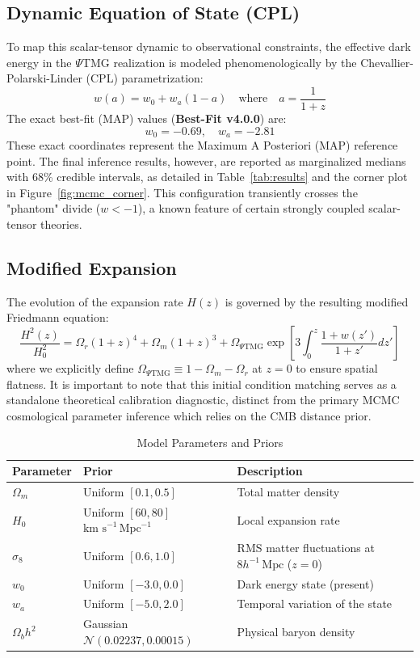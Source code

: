 \documentclass[11pt, a4paper]{article}
\begin{document}
\subsection{Dynamic Equation of State (CPL)}
To map this scalar-tensor dynamic to observational constraints, the effective dark energy in the $\Psi$TMG realization is modeled phenomenologically by the Chevallier-Polarski-Linder (CPL) parametrization:
\begin{equation}
    w(a) = w_0 + w_a (1 - a) \quad \text{where} \quad a = \frac{1}{1+z}
\end{equation}
The exact best-fit (MAP) values (\textbf{Best-Fit v4.0.0}) are:
$$ w_0 = -0.69, \quad w_a = -2.81 $$
These exact coordinates represent the Maximum A Posteriori (MAP) reference point. The final inference results, however, are reported as marginalized medians with 68\% credible intervals, as detailed in Table~\ref{tab:results} and the corner plot in Figure~\ref{fig:mcmc_corner}.
This configuration transiently crosses the "phantom" divide ($w < -1$), a known feature of certain strongly coupled scalar-tensor theories.

\subsection{Modified Expansion}
The evolution of the expansion rate $H(z)$ is governed by the resulting modified Friedmann equation:
\begin{equation}
    \frac{H^2(z)}{H_0^2} = \Omega_r (1+z)^4 + \Omega_m (1+z)^3 + \Omega_{\Psi\mathrm{TMG}} \exp\left[3 \int_0^z \frac{1+w(z')}{1+z'} dz'\right]
\end{equation}
where we explicitly define $\Omega_{\Psi\mathrm{TMG}} \equiv 1 - \Omega_m - \Omega_r$ at $z=0$ to ensure spatial flatness.
It is important to note that this initial condition matching serves as a standalone theoretical calibration diagnostic, distinct from the primary MCMC cosmological parameter inference which relies on the CMB distance prior.

\begin{table}[H]
    \centering
    \caption{Model Parameters and Priors}
    \begin{tabular}{lll}
        \toprule
        Parameter & Prior & Description \\
        \midrule
        $\Omega_m$ & Uniform $[0.1, 0.5]$ & Total matter density \\
        $H_0$ & Uniform $[60, 80]$ $\text{km s}^{-1}\,\text{Mpc}^{-1}$ & Local expansion rate \\
        $\sigma_8$ & Uniform $[0.6, 1.0]$ & RMS matter fluctuations at $8 h^{-1}\,\text{Mpc}$ ($z=0$) \\
        $w_0$ & Uniform $[-3.0, 0.0]$ & Dark energy state (present) \\
        $w_a$ & Uniform $[-5.0, 2.0]$ & Temporal variation of the state \\
        $\Omega_b h^2$ & Gaussian $\mathcal{N}(0.02237, 0.00015)$ & Physical baryon density \\
        \bottomrule
    \end{tabular}
\end{table}
\end{document}
